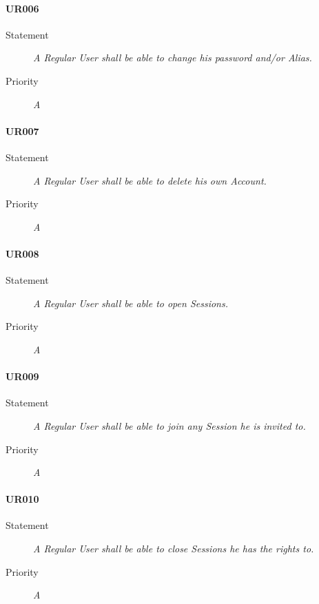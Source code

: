 \paragraph*{UR006}
\begin{description}
  \item [Statement] 
    \textit{A \gls{Regular User} shall be able to change his password and/or \gls{Alias}.}
  \item [Priority] \textit{A}
\end{description}

\paragraph*{UR007}
\begin{description}
  \item [Statement] 
    \textit{A \gls{Regular User} shall be able to delete his own \gls{Account}.}
  \item [Priority] \textit{A}
\end{description}

\paragraph*{UR008}
\begin{description}
  \item [Statement] 
    \textit{A \gls{Regular User} shall be able to open \gls{Session}s.}
  \item [Priority] \textit{A}
\end{description}

\paragraph*{UR009}
\begin{description}
  \item [Statement] 
    \textit{A \gls{Regular User} shall be able to join any \gls{Session} he is invited to.}
  \item [Priority] \textit{A}
\end{description}

\paragraph*{UR010}
\begin{description}
  \item [Statement] 
    \textit{A \gls{Regular User} shall be able to close \gls{Session}s he has the rights to.}
  \item [Priority] \textit{A}
\end{description}

